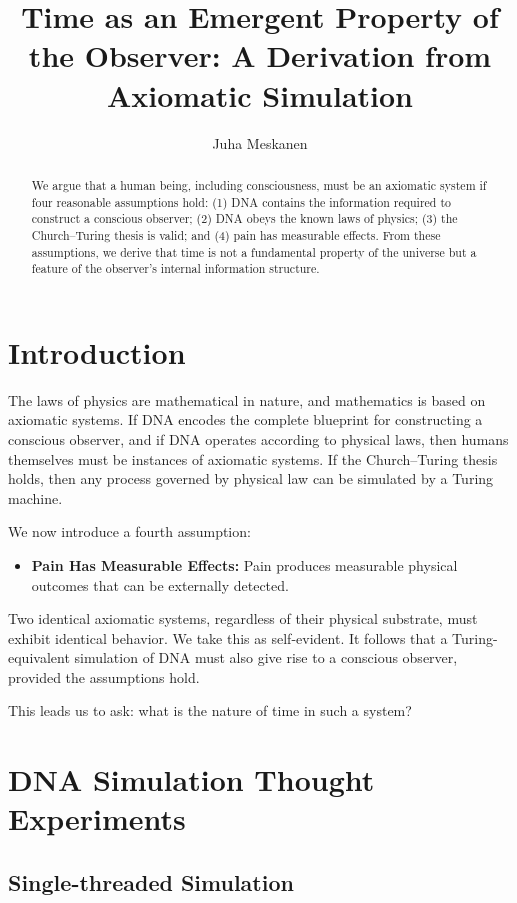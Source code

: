 \documentclass[11pt]{article}
\title{Time as an Emergent Property of the Observer: A Derivation from Axiomatic Simulation}
\author{Juha Meskanen}
\date{}
\begin{document}
\maketitle
\fi

\begin{abstract}
  We argue that a human being, including consciousness, must be an axiomatic system if four reasonable
  assumptions hold: (1) DNA contains the information required to construct a conscious observer;
  (2) DNA obeys the known laws of physics; (3) the Church--Turing thesis is valid; and (4) pain has measurable effects.
  From these assumptions, we derive that time is not a fundamental property of the universe but a feature of the
  observer's internal information structure.
\end{abstract}

\section{Introduction}

The laws of physics are mathematical in nature, and mathematics is based on axiomatic systems.
If DNA encodes the complete blueprint for constructing a conscious observer, and if DNA operates according to physical laws,
then humans themselves must be instances of axiomatic systems.
If the Church--Turing thesis holds, then any process governed by physical law can be simulated by a Turing machine.

We now introduce a fourth assumption:

\begin{itemize}
  \item \textbf{Pain Has Measurable Effects:} Pain produces measurable physical outcomes that can be externally detected.
\end{itemize}

Two identical axiomatic systems, regardless of their physical substrate, must exhibit identical behavior. We take this as self-evident. It follows that a Turing-equivalent simulation of DNA must also give rise to a conscious observer, provided the assumptions hold.

This leads us to ask: what is the nature of time in such a system?

\section{DNA Simulation Thought Experiments}

\subsection{Single-threaded Simulation}
\end{document}
